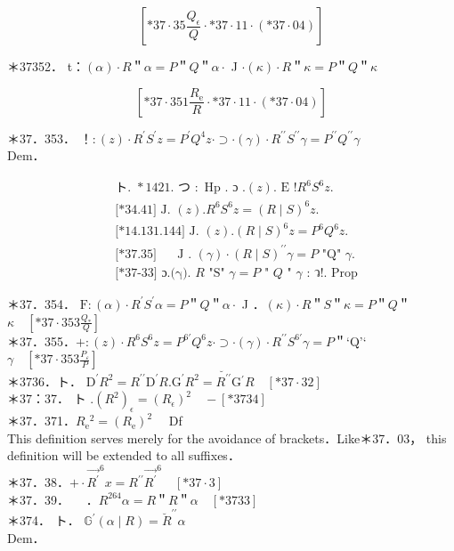 \documentclass[10pt]{article}
\begin{document}
$$
\left[* 37 \cdot 35 \frac{Q_{\epsilon}}{Q} \cdot * 37 \cdot 11 \cdot(* 37 \cdot 04)\right]
$$

＊37352． t：$(\alpha) \cdot R$＂$\alpha=P$＂$Q$＂$\alpha \cdot$ J $\cdot(\kappa) \cdot R$＂$\kappa=P$＂$Q$＂$\kappa$

$$
\left[* 37 \cdot 351 \frac{R_{\mathrm{e}}}{R} \cdot * 37 \cdot 11 \cdot(* 37 \cdot 04)\right]
$$

＊37．353． ！$:(z) \cdot R^{\prime} S^{\prime} z=P^{\prime} Q^{4} z \cdot \supset \cdot(\gamma) \cdot R^{\prime \prime} S^{\prime \prime} \gamma=P^{\prime \prime} Q^{\prime \prime} \gamma$\\
Dem．

$$
\begin{aligned}
& \text { ト. } * 1421 . \text { つ }: \text { Hp } . \text { ɔ } .(z) . \text { E }!R^{6} S^{6} z . \\
& \text { [*34.41] J. }(z) . R^{6} S^{6} z=(R \mid S)^{6} z \text {. } \\
& \text { [*14.131.144] J. }(z) .(R \mid S)^{6} z=P^{6} Q^{6} z \text {. } \\
& \text { [*37.35] } \quad \text { J . }(\gamma) \cdot(R \mid S)^{\prime \prime} \gamma=P \text { "Q" } \gamma \text {. } \\
& \text { [*37-33] ɔ.(γ). } R \text { "S" } \gamma=P \text { " } Q \text { " } \gamma \text { : ว!. Prop }
\end{aligned}
$$

＊37．354． $\mathrm{F}:(\alpha) \cdot R^{\prime} S^{\prime} \alpha=P$＂$Q$＂$\alpha \cdot$ J ．$(\kappa) \cdot R$＂$S$＂$\kappa=P$＂$Q$＂$\kappa \quad\left[* 37 \cdot 353 \frac{Q_{*}}{Q}\right]$\\
＊37．355．$+:(z) \cdot R^{6} S^{6} z=P^{6 \prime} Q^{6} z \cdot \supset \cdot(\gamma) \cdot R^{\prime \prime} S^{6 \prime} \gamma=P$＂‘Q’‘ $\gamma \quad\left[* 37 \cdot 353 \frac{P_{\varepsilon}}{P}\right]$\\
＊3736．ト． $\mathrm{D}^{\prime} R^{2}=R^{\prime \prime} \mathrm{D}^{\prime} R . \mathrm{G}^{\prime} R^{2}=\breve{R^{\prime \prime}} \mathrm{G}{ }^{\prime} R \quad[* 37 \cdot 32]$\\
＊37：37． ト $.\left(R^{2}\right)_{\epsilon}=\left(R_{\epsilon}\right)^{2} \quad-[* 3734]$\\
＊37．371．$R_{\mathrm{e}}{ }^{2}=\left(R_{\mathrm{e}}\right)^{2} \quad$ Df\\
This definition serves merely for the avoidance of brackets．Like＊37．03， this definition will be extended to all suffixes．\\
＊37．38．$+\cdot{\overrightarrow{R^{\prime}}}^{6} x=R^{\prime \prime}{\overrightarrow{R^{\prime}}}^{6} \quad[* 37 \cdot 3]$\\
＊37．39．$\quad$ ．$R^{264} \alpha=R$＂$R$＂$\alpha \quad[* 3733]$\\
＊374． ト． $\mathbb{G}^{\prime}(\alpha \mid R)=\breve{R}^{\prime \prime} \alpha$\\
Dem．
\end{document}
